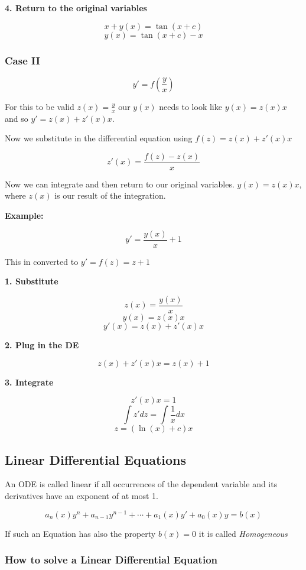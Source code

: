 \textbf{4. Return to the original variables}

\[
    x + y(x) = \tan(x + c)
\]
\[
    y(x) = \tan(x + c) - x
\]

\subsubsection{Case II}

\[
    y' = f(\frac{y}{x})
\]

For this to be valid \(z(x) = \frac{y}{x}\) our \(y(x)\) needs to look like \(y(x) = z(x)x\) 
and so \(y' = z(x) + z'(x)x\).

Now we substitute in the differential equation using \(f(z) = z(x) + z'(x)x\)

\[
    z'(x) = \frac{f(z) - z(x)}{x}
\]

Now we can integrate and then return to our original variables. \(y(x) = z(x)x \), where \(z(x)\) is our
result of the integration.

\textbf{Example:}

\[
    y' = \frac{y(x)}{x} + 1
\]

This in converted to \(y' = f(z) = z + 1\)

\textbf{1. Substitute}

\[
    z(x) = \frac{y(x)}{x}
\]
\[
    y(x) = z(x)x
\]
\[
    y'(x) = z(x) + z'(x)x
\]

\textbf{2. Plug in the DE}

\[
    z(x) + z'(x)x = z(x) + 1
\]

\textbf{3. Integrate}

\[
    z'(x)x = 1
\]
\[
    \int z' dz = \int \frac{1}{x} dx
\]
\[
    z = (\ln(x) + c)x
\]

\subsection{Linear Differential Equations}

An ODE is called linear if all occurrences of the dependent variable and its
derivatives have an exponent of at most 1.

\[
    a_n(x)y^n + a_{n - 1}y^{n -1} + \cdots + a_1(x)y' + a_0(x)y = b(x)
\]

If such an Equation has also the property \(b(x) = 0\) it is called \emph{Homogeneous}

\subsubsection{How to solve a Linear Differential Equation}

